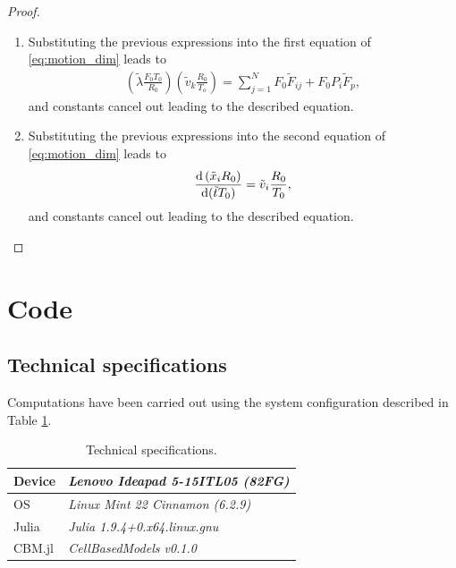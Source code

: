 \begin{proof}
    \hfill
    \begin{enumerate}
        \item Substituting the previous expressions into the first equation of \ref{eq:motion_dim} leads to
        \begin{align*}
            \left(\tilde{\lambda}\frac{F_0T_0}{R_0}\right) \left(\tilde{v}_k\frac{R_0}{T_o}\right) = \sum_{j=1}^{N} F_0\tilde F_{ij}+ F_0 P_i\tilde F_p,
        \end{align*}
        and constants cancel out leading to the described equation.
        \item Substituting the previous expressions into the second equation of \ref{eq:motion_dim} leads to
        \begin{align*}
            \frac{\mathrm{d} \left(\tilde{x}_i R_0\right)}{\mathrm{d}(\tilde t T_0)} = \tilde v_i \frac{R_0}{T_0},
        \end{align*}
        and constants cancel out leading to the described equation.
    \end{enumerate}
\end{proof}



\section{Code}\label{sec:code}

\subsection{Technical specifications}\label{sec:specs}

Computations have been carried out using the system configuration described in Table \ref{tab:specs}.

\begin{table}[ht]
    \centering
    \begin{tabular}{|l|l|}
        \hline
        Device & \textit{Lenovo Ideapad 5-15ITL05 (82FG)} \\ \hline
        OS & \textit{Linux Mint 22 Cinnamon (6.2.9)} \\ \hline
        Julia & \textit{Julia 1.9.4+0.x64.linux.gnu} \\ \hline
        CBM.jl & \textit{CellBasedModels v0.1.0} \\ \hline
    \end{tabular}
    \caption{Technical specifications.}
    \label{tab:specs}
\end{table}
    

